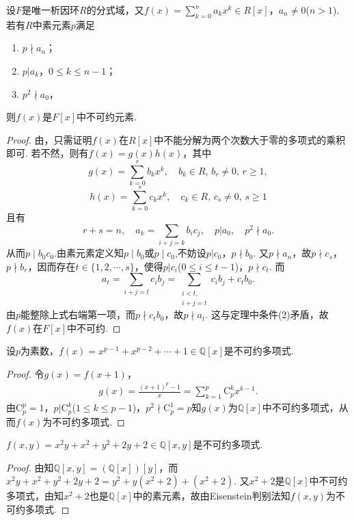 \documentclass[../../main.tex]{subfiles}%
\begin{document}
\begin{theorem}\label{theorem:抽象代数--定理2.7.5}
设$F$是唯一析因环$R$的分式域，又$f(x) = \sum\limits_{k=0}^n a_kx^k \in R[x]$，$a_n \neq 0$($n > 1$). 若有$R$中素元素$p$满足
\begin{enumerate}[(1)]
\item $p \nmid a_n$；
\item $p|a_k$，$0 \leqslant k \leqslant n-1$；
\item $p^2 \nmid a_0$，
\end{enumerate}
则$f(x)$是$F[x]$中不可约元素.
\end{theorem}
\begin{proof}
由，只需证明$f(x)$在$R[x]$中不能分解为两个次数大于零的多项式的乘积即可. 若不然，则有$f(x) = g(x)h(x)$，其中
\[
g(x) = \sum\limits_{k=0}^r b_kx^k, \quad b_k \in R, \, b_r \neq 0, \, r \geqslant 1,
\]
\[
h(x) = \sum\limits_{k=0}^s c_kx^k, \quad c_k \in R, \, c_s \neq 0, \, s \geqslant 1
\]
且有
\[
r + s = n, \quad a_k = \sum\limits_{i+j=k} b_ic_j, \quad p|a_0, \quad p^2 \nmid a_0.
\]
从而$p\mid b_0c_0$.由素元素定义知$p\mid b_0$或$p\mid c_0$,不妨设$p|c_0$，$p \nmid b_0$. 又$p \nmid a_n$，故$p \nmid c_s$，$p \nmid b_r$，因而存在$t\in \{1,2,\cdots,s\}$，使得$p|c_i$($0 \leqslant i \leqslant t-1$)，$p \nmid c_t$. 而
\[
a_t = \sum\limits_{i+j=t} c_ib_j = \sum\limits_{\substack{i<t, \\ i+j=t}}c_ib_j + c_tb_0.
\]
由$p$能整除上式右端第一项，而$p \nmid c_tb_0$，故$p \nmid a_t$. 这与定理中条件(2)矛盾，故$f(x)$在$F[x]$中不可约.
\end{proof}

\begin{example}
设$p$为素数，$f(x) = x^{p-1} + x^{p-2} + \cdots + 1 \in \mathbb{Q}[x]$是不可约多项式.
\end{example}
\begin{proof}
令$g(x) = f(x+1)$，
\begin{align*}
g(x) = \frac{(x+1)^p - 1}{x} = \sum\limits_{k=1}^p \mathrm{C}_p^k x^{k-1}.
\end{align*}
由$\mathrm{C}_p^p = 1$，$p|\mathrm{C}_p^k$($1 \leqslant k \leqslant p-1$)，$p^2 \nmid \mathrm{C}_p^1 = p$知$g(x)$为$\mathbb{Q}[x]$中不可约多项式，从而$f(x)$为不可约多项式.
\end{proof}

\begin{example}
$f(x, y) = x^2y + x^2 + y^2 + 2y + 2 \in \mathbb{Q}[x, y]$是不可约多项式.
\end{example}
\begin{proof}
由知$\mathbb{Q}[x, y] = (\mathbb{Q}[x])[y]$，而$x^2y + x^2 + y^2 + 2y + 2 = y^2 + y(x^2 + 2) + (x^2 + 2)$. 又$x^2 + 2$是$\mathbb{Q}[x]$中不可约多项式，由知$x^2 + 2$也是$\mathbb{Q}[x]$中的素元素，故由Eisenstein判别法知$f(x, y)$为不可约多项式.
\end{proof}
\end{document}
